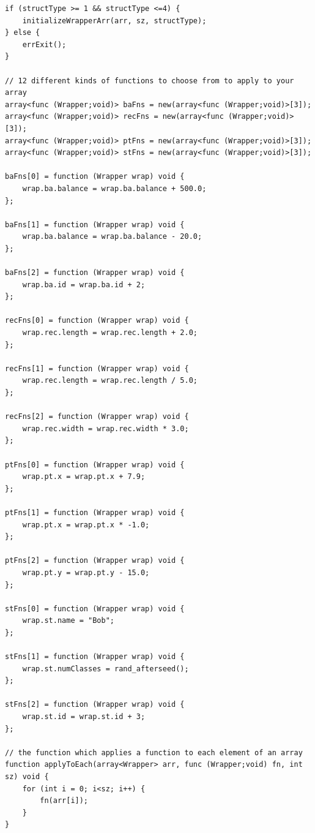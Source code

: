 \documentclass[12pt]{article}
\begin{document}
\begin{mdframed}[hidealllines=true,backgroundcolor=blue!20]
\begin{lstlisting}
if (structType >= 1 && structType <=4) {
	initializeWrapperArr(arr, sz, structType);
} else {
	errExit();
}

// 12 different kinds of functions to choose from to apply to your array
array<func (Wrapper;void)> baFns = new(array<func (Wrapper;void)>[3]);
array<func (Wrapper;void)> recFns = new(array<func (Wrapper;void)>[3]);
array<func (Wrapper;void)> ptFns = new(array<func (Wrapper;void)>[3]);
array<func (Wrapper;void)> stFns = new(array<func (Wrapper;void)>[3]);

baFns[0] = function (Wrapper wrap) void {
	wrap.ba.balance = wrap.ba.balance + 500.0;
};

baFns[1] = function (Wrapper wrap) void {
	wrap.ba.balance = wrap.ba.balance - 20.0;
};

baFns[2] = function (Wrapper wrap) void {
	wrap.ba.id = wrap.ba.id + 2;
};

recFns[0] = function (Wrapper wrap) void {
	wrap.rec.length = wrap.rec.length + 2.0;
};

recFns[1] = function (Wrapper wrap) void {
	wrap.rec.length = wrap.rec.length / 5.0;
};

recFns[2] = function (Wrapper wrap) void {
	wrap.rec.width = wrap.rec.width * 3.0;
};

ptFns[0] = function (Wrapper wrap) void {
	wrap.pt.x = wrap.pt.x + 7.9;
};

ptFns[1] = function (Wrapper wrap) void {
	wrap.pt.x = wrap.pt.x * -1.0;
};

ptFns[2] = function (Wrapper wrap) void {
	wrap.pt.y = wrap.pt.y - 15.0;
};

stFns[0] = function (Wrapper wrap) void {
	wrap.st.name = "Bob";
};

stFns[1] = function (Wrapper wrap) void {
	wrap.st.numClasses = rand_afterseed();
};

stFns[2] = function (Wrapper wrap) void {
	wrap.st.id = wrap.st.id + 3;
};

// the function which applies a function to each element of an array
function applyToEach(array<Wrapper> arr, func (Wrapper;void) fn, int sz) void {
	for (int i = 0; i<sz; i++) {
		fn(arr[i]);
	}
}


\end{lstlisting}
\end{mdframed}
\end{document}
